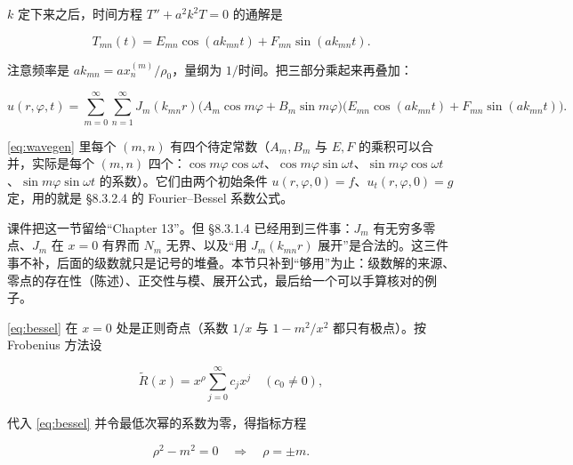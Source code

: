 
$k$ 定下来之后，时间方程 $T''+a^2k^2T=0$ 的通解是

\[
T_{mn}(t)=E_{mn}\cos(a k_{mn}t)+F_{mn}\sin(a k_{mn}t).
\]

注意频率是 $a k_{mn}=a x_n^{(m)}/\rho_0$，量纲为 $1/$时间。把三部分乘起来再叠加：

\begin{equation}
u(r,\varphi,t)=\sum_{m=0}^{\infty}\sum_{n=1}^{\infty}J_m(k_{mn}r)\big(A_m\cos m\varphi+B_m\sin m\varphi\big)\big(E_{mn}\cos(a k_{mn}t)+F_{mn}\sin(a k_{mn}t)\big).
\label{eq:wavegen}
\end{equation}

\eqref{eq:wavegen} 里每个 $(m,n)$ 有四个待定常数（$A_m,B_m$ 与 $E,F$ 的乘积可以合并，实际是每个 $(m,n)$ 四个：$\cos m\varphi\cos\omega t$、$\cos m\varphi\sin\omega t$、$\sin m\varphi\cos\omega t$、$\sin m\varphi\sin\omega t$ 的系数）。它们由两个初始条件 $u(r,\varphi,0)=f$、$u_t(r,\varphi,0)=g$ 定，用的就是 \S8.3.2.4 的 Fourier--Bessel 系数公式。



\label{sec:832}


课件把这一节留给“Chapter 13”。但 \S8.3.1.4 已经用到三件事：$J_m$ 有无穷多零点、$J_m$ 在 $x=0$ 有界而 $N_m$ 无界、以及“用 $J_m(k_{mn}r)$ 展开”是合法的。这三件事不补，后面的级数就只是记号的堆叠。本节只补到“够用”为止：级数解的来源、零点的存在性（陈述）、正交性与模、展开公式，最后给一个可以手算核对的例子。


\eqref{eq:bessel} 在 $x=0$ 处是正则奇点（系数 $1/x$ 与 $1-m^2/x^2$ 都只有极点）。按 Frobenius 方法设

\[
\tilde R(x)=x^{\rho}\sum_{j=0}^{\infty}c_jx^j\quad(c_0\ne0),
\]

代入 \eqref{eq:bessel} 并令最低次幂的系数为零，得指标方程

\[
\rho^2-m^2=0\quad\Longrightarrow\quad \rho=\pm m .
\]

